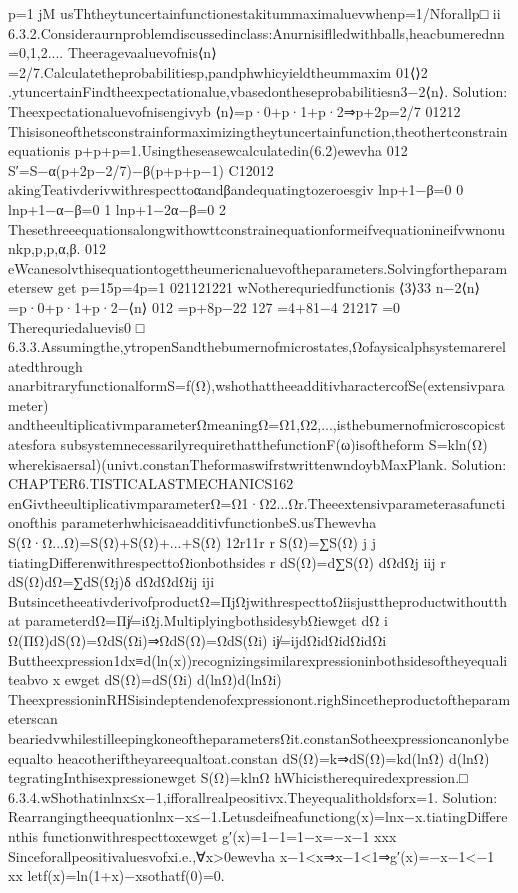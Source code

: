 {{{{{{{{{{p=1
jM
usThtheytuncertainfunctionestakitummaximaluevwhenp=1/Nforallp□
ii
6.3.2.Consideraurnproblemdiscussedinclass:Anurnisiflledwithballs,heacbumerednn=0,1,2....
Theeragevaaluevofnis⟨n⟩=2/7.Calculatetheprobabilitiesp,pandphwhicyieldtheummaxim
01⟨⟩2
.ytuncertainFindtheexpectationalue,vbasedontheseprobabilitiesn3−2⟨n⟩.
Solution:
Theexpectationaluevofnisengivyb
⟨n⟩=p·0+p·1+p·2⇒p+2p=2/7
01212
Thisisoneofthetsconstrainformaximizingtheytuncertainfunction,theothertconstrainequationis
p+p+p=1.Usingtheseasewcalculatedin(6.2)ewevha
012
S′=S−α(p+2p−2/7)−β(p+p+p−1)
C12012
akingTeativderivwithrespecttoαandβandequatingtozeroesgiv
lnp+1−β=0
0
lnp+1−α−β=0
1
lnp+1−2α−β=0
2
Thesethreeequationsalongwithowttconstrainequationformeifvequationineifvwnonunkp,p,p,α,β.
012
eWcanesolvthisequationtogettheumericnaluevoftheparameters.Solvingfortheparametersew
get
p=15p=4p=1
021121221
wNotherequriedfunctionis
⟨3⟩33
n−2⟨n⟩=p·0+p·1+p·2−⟨n⟩
012
=p+8p−22
127
=4+81−4
21217
=0
Therequriedaluevis0
□
6.3.3.Assumingthe,ytropenSandthebumernofmicrostates,Ωofaysicalphsystemarerelatedthrough
anarbitraryfunctionalformS=f(Ω),wshothattheeadditivharactercofSe(extensivparameter)
andtheeultiplicativmparameterΩmeaningΩ=Ω1,Ω2,...,isthebumernofmicroscopicstatesfora
subsystemnecessarilyrequirethatthefunctionF(ω)isoftheform
S=kln(Ω)
wherekisaersal)(univt.constanTheformaswifrstwrittenwndoybMaxPlank.
Solution:
CHAPTER6.TISTICALASTMECHANICS162
enGivtheeultiplicativmparameterΩ=Ω1·Ω2...Ωr.Theeextensivparameterasafunctionofthis
parameterhwhicisaeadditivfunctionbeS.usThewevha
S(Ω·Ω...Ω)=S(Ω)+S(Ω)+...+S(Ω)
12r11r
r
S(Ω)=∑S(Ω)
j
j
tiatingDifferenwithrespecttoΩionbothsides
r
dS(Ω)=d∑S(Ω)
dΩdΩj
iij
r
dS(Ω)dΩ=∑dS(Ωj)δ
dΩdΩdΩij
iji
ButsincetheeativderivofproductΩ=ΠjΩjwithrespecttoΩiisjusttheproductwithoutthat
parameterdΩ=Πj̸=iΩj.MultiplyingbothsidesybΩiewget
dΩ
i
Ω(ΠΩ)dS(Ω)=ΩdS(Ωi)⇒ΩdS(Ω)=ΩdS(Ωi)
ij̸=ijdΩidΩidΩidΩi
Buttheexpression1dx≡d(ln(x))recognizingsimilarexpressioninbothsidesoftheyequaliteabvo
x
ewget
dS(Ω)=dS(Ωi)
d(lnΩ)d(lnΩi)
TheexpressioninRHSisindeptendenofexpressionont.righSincetheproductoftheparameterscan
beariedvwhilestilleepingkoneoftheparametersΩit.constanSotheexpressioncanonlybeequalto
heacotheriftheyareequaltoat.constan
dS(Ω)=k⇒dS(Ω)=kd(lnΩ)
d(lnΩ)
tegratingInthisexpressionewget
S(Ω)=klnΩ
hWhicistherequiredexpression.□
6.3.4.wShothatinlnx≤x−1,ifforallrealpeositivx.Theyequalitholdsforx=1.
Solution:
Rearrangingtheequationlnx−x≤−1.Letusdeifneafunctiong(x)=lnx−x.tiatingDifferenthis
functionwithrespecttoxewget
g′(x)=1−1=1−x=−x−1
xxx
Sinceforallpeositivaluesvofxi.e.,∀x>0ewevha
x−1<x⇒x−1<1⇒g′(x)=−x−1<−1
xx
letf(x)=ln(1+x)−xsothatf(0)=0.
}}}}}}}}}}

